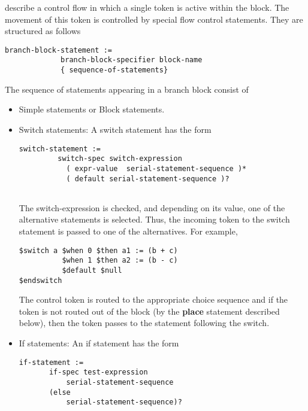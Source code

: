 \documentclass{article}
\begin{document}
\begin{itemize}
describe a control flow in which a single token 
is active within the block.  The movement of this token is
controlled by special flow control statements.
They are structured 
as follows
\begin{verbatim}
branch-block-statement :=
             branch-block-specifier block-name
             { sequence-of-statements}
\end{verbatim}
The sequence of statements appearing in a branch block
consist of
\begin{itemize}
\item Simple statements or Block statements.
\item Switch statements: A switch statement has
the form
\begin{verbatim}
switch-statement :=
         switch-spec switch-expression
           ( expr-value  serial-statement-sequence )*
           ( default serial-statement-sequence )?
            
\end{verbatim}
The switch-expression is checked, and depending on its
value, one of the alternative statements is selected.
Thus, the incoming token to the switch statement is 
passed to one of the alternatives.  For example,
\begin{verbatim}
$switch a $when 0 $then a1 := (b + c)
          $when 1 $then a2 := (b - c)
          $default $null
$endswitch
\end{verbatim}
The control token is routed to the appropriate
choice sequence and if the token is not routed out 
of the block (by the {\bf place} statement 
described below), then the token passes to the
statement following the switch. 
\item If statements: An if statement has the form
\begin{verbatim}
if-statement :=
       if-spec test-expression 
           serial-statement-sequence
       (else
           serial-statement-sequence)?
       

\end{verbatim}
\end{itemize}
\end{itemize}
\end{document}
